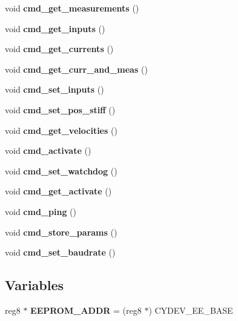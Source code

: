 \begin{DoxyCompactItemize}
void \textbf{ cmd\+\_\+get\+\_\+measurements} ()
\item 
\mbox{\label{command__processing_8c_a20db4694e8caa572ec479f73ce8b3b02}} 
void {\bfseries cmd\+\_\+get\+\_\+inputs} ()
\item 
\mbox{\label{command__processing_8c_aaf613e251c1e14fe4fffe3e9e033f9f7}} 
void {\bfseries cmd\+\_\+get\+\_\+currents} ()
\item 
\mbox{\label{command__processing_8c_a45a90a8455bfdb6a7f0e118da2c6f0a6}} 
void {\bfseries cmd\+\_\+get\+\_\+curr\+\_\+and\+\_\+meas} ()
\item 
\mbox{\label{command__processing_8c_a2d8a4542f55af960a27f875b00aad6a1}} 
void {\bfseries cmd\+\_\+set\+\_\+inputs} ()
\item 
\mbox{\label{command__processing_8c_a7897817859ac33d5a20b710af0f6a044}} 
void {\bfseries cmd\+\_\+set\+\_\+pos\+\_\+stiff} ()
\item 
\mbox{\label{command__processing_8c_a212883283bd7a8f32846615271cad8ce}} 
void {\bfseries cmd\+\_\+get\+\_\+velocities} ()
\item 
\mbox{\label{command__processing_8c_a107fc9f2982f9a953bdd82aa07279499}} 
void {\bfseries cmd\+\_\+activate} ()
\item 
\mbox{\label{command__processing_8c_aa94cd9c2e2fbfc5b98e84f67569cfe82}} 
void {\bfseries cmd\+\_\+set\+\_\+watchdog} ()
\item 
\mbox{\label{command__processing_8c_a554d563001517bfbc44400a1e999b393}} 
void {\bfseries cmd\+\_\+get\+\_\+activate} ()
\item 
\mbox{\label{command__processing_8c_a704f8c8cb0f4d75f243fc2b79bc34188}} 
void {\bfseries cmd\+\_\+ping} ()
\item 
\mbox{\label{command__processing_8c_a1a2493bfc2f30171d7e7a3bd5aebab14}} 
void {\bfseries cmd\+\_\+store\+\_\+params} ()
\item 
\mbox{\label{command__processing_8c_aa86bf1f2fa69ab5927f7e4e40eb40581}} 
void {\bfseries cmd\+\_\+set\+\_\+baudrate} ()
\end{DoxyCompactItemize}
\subsection*{Variables}
\begin{DoxyCompactItemize}
\item 
\mbox{\label{command__processing_8c_aba5b9353e6d38cc61eb2bd363df61248}} 
reg8 $\ast$ {\bfseries E\+E\+P\+R\+O\+M\+\_\+\+A\+D\+DR} = (reg8 $\ast$) C\+Y\+D\+E\+V\+\_\+\+E\+E\+\_\+\+B\+A\+SE
\end{DoxyCompactItemize}


